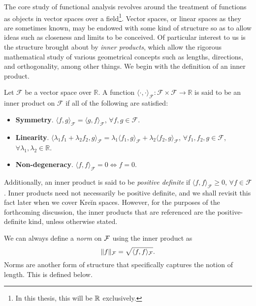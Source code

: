 The core study of functional analysis revolves around the treatment of functions as objects in vector spaces over a field\footnote{In this thesis, this will be $\mathbb{R}$ exclusively.}.
Vector spaces, or linear spaces as they are sometimes known, may be endowed with some kind of structure so as to allow ideas such as closeness and limits to be conceived.
Of particular interest to us is the structure brought about by \emph{inner products}, which allow the rigorous mathematical study of various geometrical concepts such as lengths, directions, and orthogonality, among other things.
We begin with the definition of an inner product. 

\begin{definition}\label{def:innerprod}
	Let $\mathcal F$ be a vector space over $\mathbb R$. A function $\langle\cdot,\cdot\rangle_{\mathcal F}:\mathcal F \times \mathcal F \rightarrow \mathbb R$ is said to be an inner product on $\mathcal F$ if all of the following are satisfied:
	\begin{itemize}
	\item \textbf{Symmetry}. $\langle f, g\rangle_{\mathcal F} = \langle g, f \rangle_{\mathcal F}$, $\forall f,g \in \mathcal F$.
	\item \textbf{Linearity}. $\langle \lambda_1 f_1 + \lambda_2 f_2, g\rangle_{\mathcal F} = \lambda_1\langle f_1,g \rangle_{\mathcal F} + \lambda_2\langle f_2,g \rangle_{\mathcal F}$, $\forall f_1, f_2, g \in \mathcal F$, $\forall \lambda_1,\lambda_2 \in \mathbb R$.
	\item \textbf{Non-degeneracy}. $\langle f, f\rangle_{\mathcal F} = 0 \Leftrightarrow f=0$.
	\end{itemize}
\end{definition}

Additionally, an inner product is said to be \emph{positive definite} if $\langle f, f\rangle_{\mathcal F} \geq 0$, $\forall f \in \mathcal F$.
Inner products need not necessarily be positive definite, and we shall revisit this fact later when we cover Kreĭn spaces.
However, for the purposes of the forthcoming discussion, the inner products that are referenced are the positive-definite kind, unless otherwise stated.

We can always define a \emph{norm} on ${\mathcal F}$ using the inner product as 
\begin{equation}\label{eq:normip}
  \lVert f\rVert_{\mathcal F} = \sqrt{\langle f,f\rangle_{\mathcal F}}.
\end{equation}
Norms are another form of structure that specifically captures the notion of length. 
This is defined below.

